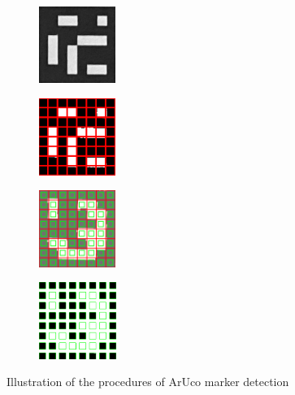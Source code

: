 \documentclass[../Head/report.tex]{subfiles}
\begin{document}
\begin{figure}[H]
    \centering
    \begin{subfigure}[b]{.20\textwidth}
        \centering
        \includegraphics[height=2.5cm]{../Figures/aruco_detection2.png}
        \caption{}
        \label{fig:aruco_detection2}
    \end{subfigure}
        \begin{subfigure}[b]{.20\textwidth}
        \centering
        \includegraphics[height=2.5cm]{../Figures/aruco_detection3.png}
        \caption{}
        \label{fig:aruco_detection3}
    \end{subfigure}
        \begin{subfigure}[b]{.20\textwidth}
        \centering
        \includegraphics[height=2.5cm]{../Figures/aruco_detection4.png}
        \caption{}
        \label{fig:aruco_detection4}
    \end{subfigure}
        \begin{subfigure}[b]{.20\textwidth}
        \centering
        \includegraphics[height=2.5cm]{../Figures/aruco_detection5.png}
        \caption{}
        \label{fig:aruco_detection5}
    \end{subfigure}
    \caption{Illustration of the procedures of ArUco marker detection \cite{arucoMarkerDetection}}
    \label{fig:aruco_detection_procedure}
\end{figure}
\end{document}
